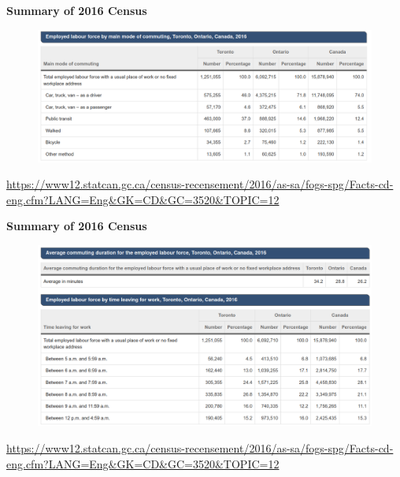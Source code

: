 \documentclass[aspectratio=169]{beamer}
\begin{document}
\begin{frame}
	
	\textbf{Summary of 2016 Census}
	
	\begin{figure}
		\centering
		\includegraphics[width=1\linewidth]{images/tor_mode_2016.png}
	\end{figure}
	
	\tiny\url{https://www12.statcan.gc.ca/census-recensement/2016/as-sa/fogs-spg/Facts-cd-eng.cfm?LANG=Eng\&GK=CD\&GC=3520\&TOPIC=12}
	
	
\end{frame}



\begin{frame}
	
	\textbf{Summary of 2016 Census}
	
	\begin{figure}
		\centering
		\includegraphics[width=1\linewidth]{images/tor_time_2016.png}
	\end{figure}
	
	\tiny\url{https://www12.statcan.gc.ca/census-recensement/2016/as-sa/fogs-spg/Facts-cd-eng.cfm?LANG=Eng\&GK=CD\&GC=3520\&TOPIC=12}
	
	
\end{frame}
\end{document}
